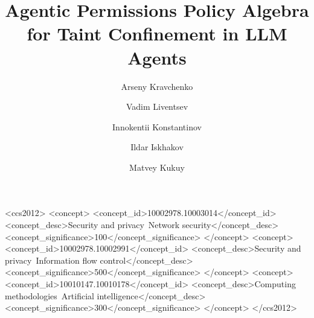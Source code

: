 \documentclass[sigconf,nonacm]{acmart}
\newcommand{\todo}[1]{\textcolor{red}{\textbf{[TODO:} #1\textbf{]}}}
\begin{document}
\title[APPA]{Agentic Permissions Policy Algebra for Taint Confinement in LLM Agents}

\author{Arseny Kravchenko}

\author{Vadim Liventsev}

\author{Innokentii Konstantinov}

\author{Ildar Iskhakov}

\author{Matvey Kukuy}

\begin{abstract}

\end{abstract}

\begin{CCSXML}
<ccs2012>
 <concept>
  <concept_id>10002978.10003014</concept_id>
  <concept_desc>Security and privacy~Network security</concept_desc>
  <concept_significance>100</concept_significance>
 </concept>
 <concept>
  <concept_id>10002978.10002991</concept_id>
  <concept_desc>Security and privacy~Information flow control</concept_desc>
  <concept_significance>500</concept_significance>
 </concept>
 <concept>
  <concept_id>10010147.10010178</concept_id>
  <concept_desc>Computing methodologies~Artificial intelligence</concept_desc>
  <concept_significance>300</concept_significance>
 </concept>
</ccs2012>
\end{CCSXML}


\maketitle










\end{document}
